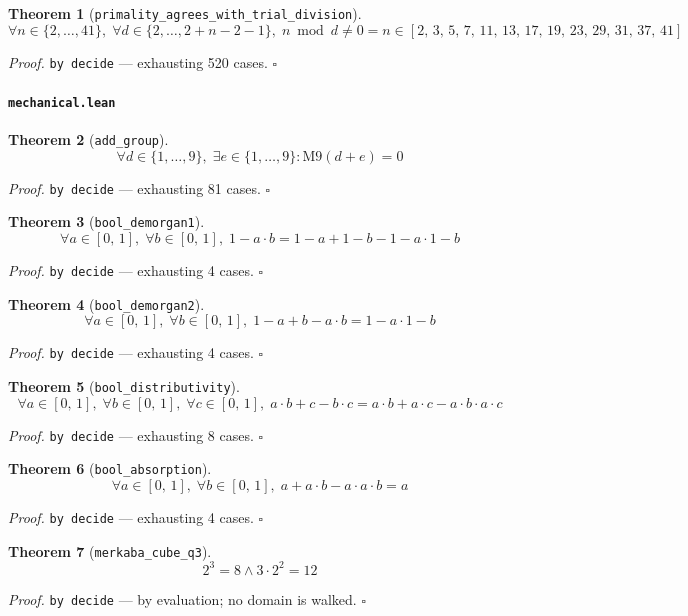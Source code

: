\documentclass[11pt]{article}
\newtheorem{theorem}{Theorem}[section]
\begin{document}
\begin{theorem}[\texttt{primality\_agrees\_with\_trial\_division}]
\[ \forall n \in \{2,\dots,41\},\; \forall d \in \{2,\dots,2+n - 2-1\},\; n \bmod d \neq 0 = n \in [2,\,3,\,5,\,7,\,11,\,13,\,17,\,19,\,23,\,29,\,31,\,37,\,41] \]
\end{theorem}
\noindent\emph{Proof.} \texttt{by decide} --- exhausting 520 cases. \hfill$\square$

\paragraph{\texttt{mechanical.lean}}

\begin{theorem}[\texttt{add\_group}]
\[ \forall d \in \{1,\dots,9\},\; \exists e \in \{1,\dots,9\} : \mathrm{M9}\mathopen{}\left(d + e\right) = 0 \]
\end{theorem}
\noindent\emph{Proof.} \texttt{by decide} --- exhausting 81 cases. \hfill$\square$

\begin{theorem}[\texttt{bool\_demorgan1}]
\[ \forall a \in [0,\,1],\; \forall b \in [0,\,1],\; 1 - a \cdot b = 1 - a + 1 - b - 1 - a \cdot 1 - b \]
\end{theorem}
\noindent\emph{Proof.} \texttt{by decide} --- exhausting 4 cases. \hfill$\square$

\begin{theorem}[\texttt{bool\_demorgan2}]
\[ \forall a \in [0,\,1],\; \forall b \in [0,\,1],\; 1 - a + b - a \cdot b = 1 - a \cdot 1 - b \]
\end{theorem}
\noindent\emph{Proof.} \texttt{by decide} --- exhausting 4 cases. \hfill$\square$

\begin{theorem}[\texttt{bool\_distributivity}]
\[ \forall a \in [0,\,1],\; \forall b \in [0,\,1],\; \forall c \in [0,\,1],\; a \cdot b + c - b \cdot c = a \cdot b + a \cdot c - a \cdot b \cdot a \cdot c \]
\end{theorem}
\noindent\emph{Proof.} \texttt{by decide} --- exhausting 8 cases. \hfill$\square$

\begin{theorem}[\texttt{bool\_absorption}]
\[ \forall a \in [0,\,1],\; \forall b \in [0,\,1],\; a + a \cdot b - a \cdot a \cdot b = a \]
\end{theorem}
\noindent\emph{Proof.} \texttt{by decide} --- exhausting 4 cases. \hfill$\square$

\begin{theorem}[\texttt{merkaba\_cube\_q3}]
\[ 2^{3} = 8 \land 3 \cdot 2^{2} = 12 \]
\end{theorem}
\noindent\emph{Proof.} \texttt{by decide} --- by evaluation; no domain is walked. \hfill$\square$
\end{document}
